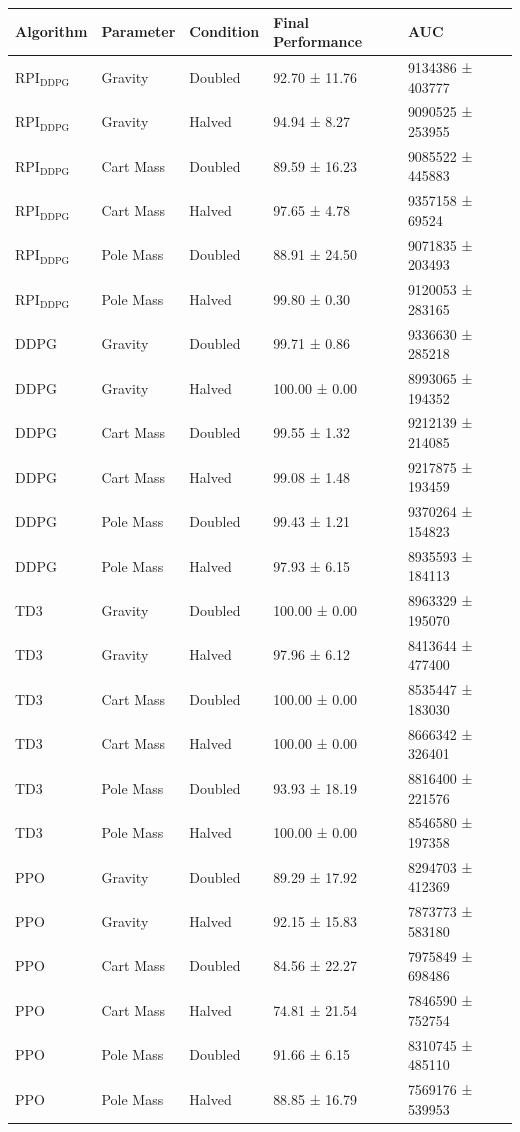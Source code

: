 \begin{tabular}{lllll}
\toprule
Algorithm & Parameter & Condition & Final Performance & AUC \\
\midrule
RPI$_{\mathrm{DDPG}}$ & Gravity & Doubled & 92.70 ± 11.76 & 9134386 ± 403777 \\
RPI$_{\mathrm{DDPG}}$ & Gravity & Halved & 94.94 ± 8.27 & 9090525 ± 253955 \\
RPI$_{\mathrm{DDPG}}$ & Cart Mass & Doubled & 89.59 ± 16.23 & 9085522 ± 445883 \\
RPI$_{\mathrm{DDPG}}$ & Cart Mass & Halved & 97.65 ± 4.78 & 9357158 ± 69524 \\
RPI$_{\mathrm{DDPG}}$ & Pole Mass & Doubled & 88.91 ± 24.50 & 9071835 ± 203493 \\
RPI$_{\mathrm{DDPG}}$ & Pole Mass & Halved & 99.80 ± 0.30 & 9120053 ± 283165 \\
DDPG & Gravity & Doubled & 99.71 ± 0.86 & 9336630 ± 285218 \\
DDPG & Gravity & Halved & 100.00 ± 0.00 & 8993065 ± 194352 \\
DDPG & Cart Mass & Doubled & 99.55 ± 1.32 & 9212139 ± 214085 \\
DDPG & Cart Mass & Halved & 99.08 ± 1.48 & 9217875 ± 193459 \\
DDPG & Pole Mass & Doubled & 99.43 ± 1.21 & 9370264 ± 154823 \\
DDPG & Pole Mass & Halved & 97.93 ± 6.15 & 8935593 ± 184113 \\
TD3 & Gravity & Doubled & 100.00 ± 0.00 & 8963329 ± 195070 \\
TD3 & Gravity & Halved & 97.96 ± 6.12 & 8413644 ± 477400 \\
TD3 & Cart Mass & Doubled & 100.00 ± 0.00 & 8535447 ± 183030 \\
TD3 & Cart Mass & Halved & 100.00 ± 0.00 & 8666342 ± 326401 \\
TD3 & Pole Mass & Doubled & 93.93 ± 18.19 & 8816400 ± 221576 \\
TD3 & Pole Mass & Halved & 100.00 ± 0.00 & 8546580 ± 197358 \\
PPO & Gravity & Doubled & 89.29 ± 17.92 & 8294703 ± 412369 \\
PPO & Gravity & Halved & 92.15 ± 15.83 & 7873773 ± 583180 \\
PPO & Cart Mass & Doubled & 84.56 ± 22.27 & 7975849 ± 698486 \\
PPO & Cart Mass & Halved & 74.81 ± 21.54 & 7846590 ± 752754 \\
PPO & Pole Mass & Doubled & 91.66 ± 6.15 & 8310745 ± 485110 \\
PPO & Pole Mass & Halved & 88.85 ± 16.79 & 7569176 ± 539953 \\
\bottomrule
\end{tabular}
